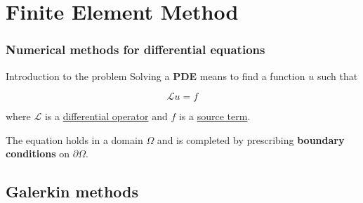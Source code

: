 \section{Finite Element Method}

\begin{frame}
   \frametitle{Numerical methods for differential equations}

   
\end{frame}

\begin{frame}{Introduction to the problem}
   Solving a \textbf{\textcolor{BrickRed}{PDE}} means to find a function $u$ such that

   \begin{equation*}
      \mathcal{L}u=f
   \end{equation*}

   where $\mathcal{L}$ is a \underline{differential operator} and $f$ is a \underline{source term}.

   \vspace{0.3cm}

   The equation holds in a domain $\Omega$ and is completed by prescribing \textbf{boundary conditions} on $\partial\Omega$.

   \vfill

   \pause

   
\end{frame}

\subsection{Galerkin methods}

